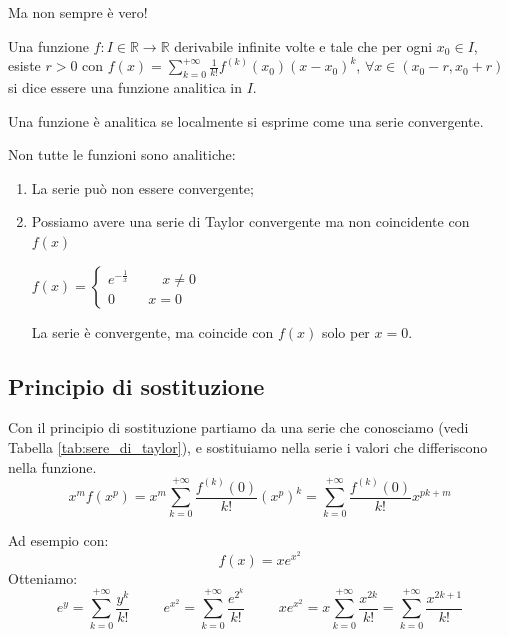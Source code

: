 Ma non sempre è vero!
\begin{definition*}
    Una funzione $f:I\in\mathbb{R}\to\mathbb{R}$ derivabile infinite volte e tale che per ogni $x_0\in I$, esiste $r>0$ con $f(x)=\sum^{+\infty}_{k=0}\frac{1}{k!}f^{(k)}(x_0)(x-x_0)^k$, $\forall x\in(x_0-r,x_0+r)$ si dice essere una funzione analitica in $I$.
    
    Una funzione è analitica se localmente si esprime come una serie convergente.
\end{definition*}

\begin{controEsempio*}
    Non tutte le funzioni sono analitiche:
\begin{enumerate}
    \item La serie può non essere convergente;
    \item Possiamo avere una serie di Taylor convergente ma non coincidente con $f(x)$
    \begin{example}
        $f(x)=\begin{cases}
            e^{-\frac{1}{x}}\hspace{1cm}x\neq0\\
            0\hspace{1cm}x=0
        \end{cases}$
    
        La serie è convergente, ma coincide con $f(x)$ solo per $x=0$.
    \end{example}
\end{enumerate}
\end{controEsempio*}

\subsection*{Principio di sostituzione}
Con il principio di sostituzione partiamo da una serie che conosciamo (vedi Tabella \ref{tab:sere_di_taylor}), e sostituiamo nella serie i valori che differiscono nella funzione.\\

\begin{equation*}
    x^mf(x^p)=x^m\sum^{+\infty}_{k=0}\frac{f^{(k)}(0)}{k!}(x^p)^k=\sum^{+\infty}_{k=0}\frac{f^{(k)}(0)}{k!}x^{pk+m}
\end{equation*}

Ad esempio con: \begin{equation*}f(x)=xe^{x^2}\end{equation*}
Otteniamo:
    \begin{equation*}
        e^y=\sum^{+\infty}_{k=0}\frac{y^k}{k!}\hspace{1cm}e^{x^2}=\sum^{+\infty}_{k=0}\frac{e^{2^k}}{k!}\hspace{1cm}xe^{x^2}=x\sum^{+\infty}_{k=0}\frac{x^{2k}}{k!}=\sum^{+\infty}_{k=0}\frac{x^{2k+1}}{k!}
    \end{equation*}



